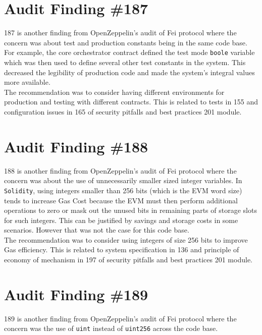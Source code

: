 \section{Audit Finding \#187}

187 is another finding from OpenZeppelin's audit of Fei protocol where the concern was about test and production constants being in the same code base. For example, the core orchestrator contract defined the test mode \verb|boole| variable which was then used to define several other test constants in the system. This decreased the legibility of production code and made the system's integral values more available.\\

The recommendation was to consider having different environments for production and testing with different contracts. This is related to tests in 155 and configuration issues in 165 of security pitfalls and best practices 201 module.

\section{Audit Finding \#188}

188 is another finding from OpenZeppelin's audit of Fei protocol where the concern was about the use of unnecessarily smaller sized integer variables. In \verb|Solidity|, using integers smaller than 256 bits (which is the EVM word size) tends to increase Gas Cost because the EVM must then perform additional operations to zero or mask out the unused bits in remaining parts of storage slots for such integers. This can be justified by savings and storage costs in some scenarios. However that was not the case for this code base.\\

The recommendation was to consider using integers of size 256 bits to improve Gas efficiency. This is related to system specification in 136 and principle of economy of mechanism in 197 of security pitfalls and best practices 201 module.

\section{Audit Finding \#189}

189 is another finding from OpenZeppelin's audit of Fei protocol where the concern was the use of \verb|uint| instead of \verb|uint256| across the code base.\\ 

